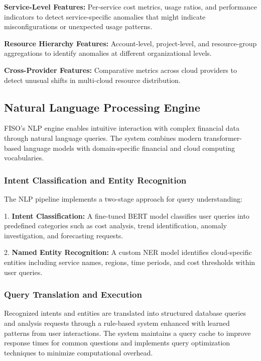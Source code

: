 \documentclass[conference]{IEEEtran}
\begin{document}
\textbf{Service-Level Features:} Per-service cost metrics, usage ratios, and performance indicators to detect service-specific anomalies that might indicate misconfigurations or unexpected usage patterns.

\textbf{Resource Hierarchy Features:} Account-level, project-level, and resource-group aggregations to identify anomalies at different organizational levels.

\textbf{Cross-Provider Features:} Comparative metrics across cloud providers to detect unusual shifts in multi-cloud resource distribution.

\subsection{Natural Language Processing Engine}

FISO's NLP engine enables intuitive interaction with complex financial data through natural language queries. The system combines modern transformer-based language models with domain-specific financial and cloud computing vocabularies.

\subsubsection{Intent Classification and Entity Recognition}

The NLP pipeline implements a two-stage approach for query understanding:

1. \textbf{Intent Classification:} A fine-tuned BERT model classifies user queries into predefined categories such as cost analysis, trend identification, anomaly investigation, and forecasting requests.

2. \textbf{Named Entity Recognition:} A custom NER model identifies cloud-specific entities including service names, regions, time periods, and cost thresholds within user queries.

\subsubsection{Query Translation and Execution}

Recognized intents and entities are translated into structured database queries and analysis requests through a rule-based system enhanced with learned patterns from user interactions. The system maintains a query cache to improve response times for common questions and implements query optimization techniques to minimize computational overhead.
\end{document}
